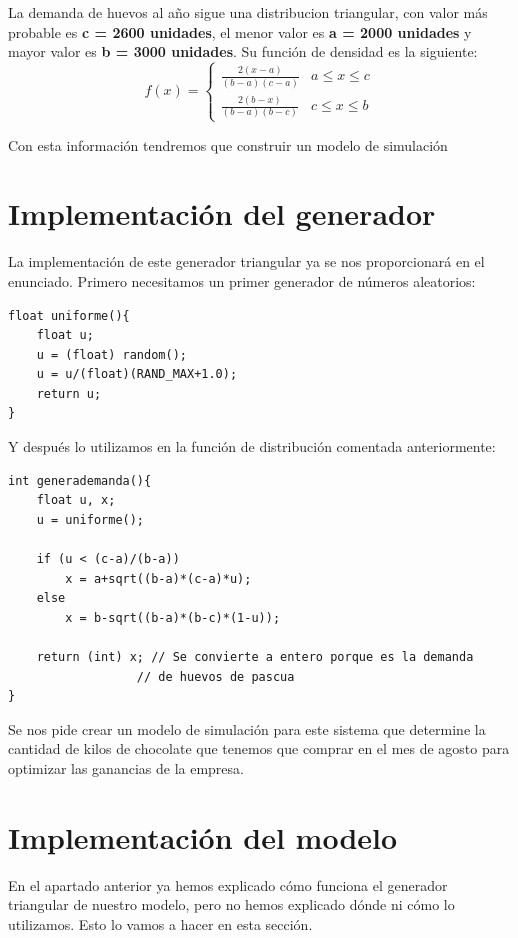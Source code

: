 \documentclass[11pt,a4paper]{article}
\begin{document}
La demanda de huevos al año sigue una distribucion triangular, con valor más probable es \textbf{c = 2600 unidades}, el menor valor es \textbf{a = 2000
unidades} y mayor valor es \textbf{b = 3000 unidades}. Su función de densidad es la siguiente:
\begin{equation*}
	f(x)=
	\left\{\begin{matrix}
	\frac{2(x-a)}{(b-a)(c-a)} & a\leq x \leq c\\ 
	\frac{2(b-x)}{(b-a)(b-c)} & c\leq x \leq b 
	\end{matrix}\right.
\end{equation*}

Con esta información tendremos que construir un modelo de simulación 



\section{Implementación del generador}

La implementación de este generador triangular ya se nos proporcionará en el enunciado. Primero necesitamos un primer generador de números aleatorios:
\begin{lstlisting}
float uniforme(){
	float u;
	u = (float) random();
	u = u/(float)(RAND_MAX+1.0);
	return u;
}
\end{lstlisting}

Y después lo utilizamos en la función de distribución comentada anteriormente:
\begin{lstlisting}
int generademanda(){
	float u, x;
	u = uniforme();
	
	if (u < (c-a)/(b-a))
		x = a+sqrt((b-a)*(c-a)*u);
	else
		x = b-sqrt((b-a)*(b-c)*(1-u));
	
	return (int) x; // Se convierte a entero porque es la demanda
                  // de huevos de pascua
}
\end{lstlisting}

Se nos pide crear un modelo de simulación para este sistema que determine la cantidad de kilos de chocolate que tenemos que comprar en el mes de agosto
para optimizar las ganancias de la empresa.


\section{Implementación del modelo}

En el apartado anterior ya hemos explicado cómo funciona el generador triangular de nuestro modelo, pero no hemos explicado dónde ni cómo lo utilizamos.
Esto lo vamos a hacer en esta sección.
\end{document}
